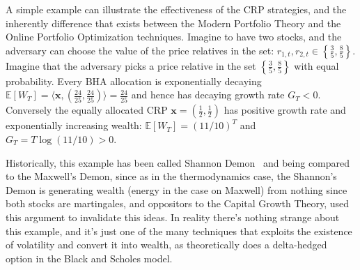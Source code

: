 A simple example can illustrate the effectiveness of the CRP strategies, and the inherently difference that exists between the Modern Portfolio Theory and the Online Portfolio Optimization techniques.
Imagine to have two stocks, and the adversary can choose the value of the price relatives in the set: $r_{1,t},r_{2,t}\in\left\{\frac{3}{5},\frac{8}{5}\right\}$. Imagine that the adversary picks a price relative in the set $\left\{\frac{3}{5},\frac{8}{5}\right\}$ with equal probability. Every BHA allocation is exponentially decaying $\mathbb E[W_T]=\langle \mathbf x, (\frac{24}{25},\frac{24}{25})\rangle=\frac{24}{25}$ and hence has decaying growth rate $G_T<0$. Conversely the equally allocated CRP $\mathbf x=(\frac{1}{2},\frac{1}{2})$ has positive growth rate and exponentially increasing wealth: $\mathbb E[W_T]=(11/10)^T$ and $G_T=T\log(11/10)>0$.

Historically, this example has been called Shannon Demon~\cite{poundstone2010fortune} and being compared to the Maxwell's Demon, since as in the thermodynamics case, the Shannon's Demon is generating wealth (energy in the case on Maxwell) from nothing since both stocks are martingales, and oppositors to the Capital Growth Theory, used this argument to invalidate this ideas. In reality there's nothing strange about this example, and it's just one of the many techniques that exploits the existence of volatility and convert it into wealth, as theoretically does a delta-hedged option in the Black and Scholes model. 

